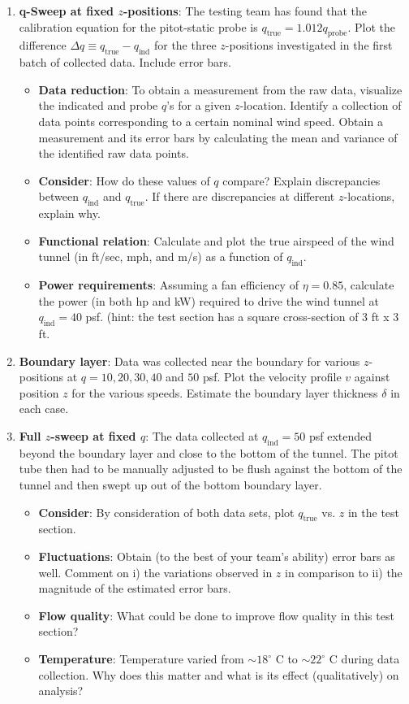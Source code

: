 \documentclass[12pt]{article}
\begin{document}
\begin{enumerate}
\item \textbf{q-Sweep at fixed $z$-positions}: The testing team has found that the calibration equation for the pitot-static probe is $q_{\text{true}} = 1.012 q_{\text{probe}}$. Plot the difference $\Delta q \equiv q_{\text{true}} - q_{\text{ind}}$ for the three $z$-positions investigated in the first batch of collected data. Include error bars.
  \begin{itemize}
  \item \textbf{Data reduction}: To obtain a measurement from the raw data, visualize the indicated and probe $q$'s for a given $z$-location. Identify a collection of data points corresponding to a certain nominal wind speed. Obtain a measurement and its error bars by calculating the mean and variance of the identified raw data points.
  \item \textbf{Consider}: How do these values of $q$ compare? Explain discrepancies between $q_{\text{ind}}$ and $q_{\text{true}}$. If there are discrepancies at different $z$-locations, explain why.
  \item \textbf{Functional relation}: Calculate and plot the true airspeed of the wind tunnel (in ft/sec, mph, and m/s) as a function of $q_{\text{ind}}$.
  \item \textbf{Power requirements}: Assuming a fan efficiency of $\eta = 0.85$, calculate the power (in both hp and kW) required to drive the wind tunnel at $q_{\text{ind}} = 40$ psf. (hint: the test section has a square cross-section of 3 ft x 3 ft.
  \end{itemize}
\item \textbf{Boundary layer}: Data was collected near the boundary for various $z$-positions at $q=10, 20, 30, 40$ and $50$ psf. Plot the velocity profile $v$ against position $z$ for the various speeds. Estimate the boundary layer thickness $\delta$ in each case.
\item \textbf{Full $z$-sweep at fixed $q$}: The data collected at $q_{\text{ind}} = 50$ psf extended beyond the boundary layer and close to the bottom of the tunnel. The pitot tube then had to be manually adjusted to be flush against the bottom of the tunnel and then swept up out of the bottom boundary layer.
  \begin{itemize}
  \item \textbf{Consider}: By consideration of both data sets, plot $q_{\text{true}}$ vs. $z$ in the test section.
  \item \textbf{Fluctuations}: Obtain (to the best of your team's ability) error bars as well. Comment on i) the variations observed in $z$ in comparison to ii) the magnitude of the estimated error bars.
  \item \textbf{Flow quality}: What could be done to improve flow quality in this test section?
  \item \textbf{Temperature}: Temperature varied from $\sim 18^\circ$ C to $\sim 22^\circ$ C during data collection. Why does this matter and what is its effect (qualitatively) on analysis?
  \end{itemize}
\end{enumerate}



\end{document}
